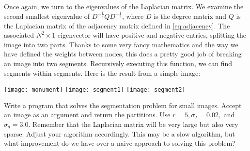 Once again, we turn to the eigenvalues of the Laplacian matrix.  We examine the second smallest eigenvalue of $D^{-\frac{1}{2}}QD^{-\frac{1}{2}}$, where $D$ is the degree matrix and $Q$ is the Laplacian matrix of the adjacency matrix defined in \eqref{eq:adjacency}.  The associated $N^2 \times 1$ eigenvector will have positive and negative entries, splitting the image into two parts.  Thanks to some very fancy mathematics and the way we have defined the weights between nodes, this does a pretty good job of breaking an image into two segments.  Recursively executing this function, we can find segments within segments.  Here is the result from a simple image:

\begin{center}
\texttt{[image: monument]}
\texttt{[image: segment1]}
\texttt{[image: segment2]}
\end{center}

\begin{problem}  Write a program that solves the segmentation problem for small images.  Accept an image as an argument and return the partitions. Use $r = 5, \sigma_I = 0.02,$ and $\sigma_d = 3.0$. Remember that the Laplacian matrix will be very large but also very sparse.  Adjust your algorithm accordingly.  This may be a slow algorithm, but what improvement do we have over a naive approach to solving this problem?
\end{problem}
